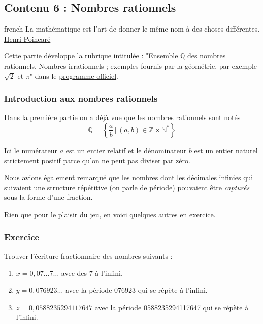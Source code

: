\documentclass[a4paper, 11pt, twoside]{article}
\newcommand{\E}[1]{\mathbb{#1}}
\begin{document}
\subsection{Contenu 6 : Nombres rationnels}
\label{sec:orgdee9ad7}

\begin{foreigndisplayquote}{french}
La mathématique est l'art de donner le même nom à des choses différentes.\\

\href{https://fr.wikipedia.org/wiki/Henri\_Poincar\%C3\%A9}{Henri Poincaré}
\end{foreigndisplayquote}


\startcontents[level-2]

Cette partie développe la rubrique intitulée : "Ensemble \(\E{Q}\) des
nombres rationnels. Nombres irrationnels ; exemples fournis par la
géométrie, par exemple \(\sqrt{2}\) et \(\pi\)" dans le \href{https://eduscol.education.fr/document/24553/download}{programme officiel}.

\subsubsection{Introduction aux nombres rationnels}
\label{sec:org38d990f}

Dans la première partie on a déjà vue que les nombres rationnels
sont notés \[\E{Q} = \left\{\dfrac{a}{b}\,|\,(a,
   b)\in\E{Z}\times\E{N}^*\right\}\]

Ici le numérateur \(a\) est un entier relatif et le dénominateur \(b\)
est un entier naturel strictement positif parce qu'on ne peut pas
diviser par zéro.

Nous avions également remarqué que les nombres dont les décimales
infinies qui suivaient une structure répétitive (on parle de
période) pouvaient être \emph{capturés} sous la forme d'une fraction.

Rien que pour le plaisir du jeu, en voici quelques autres en
exercice.

\subsubsection{Exercice}
\label{sec:orgca24f0a}
Trouver l'écriture fractionnaire des nombres suivants :
\begin{enumerate}
\item \(x = 0,07\dots7\dots\) avec des \(7\) à l'infini.
\item \(y = 0,076923\dots\) avec la période 076923 qui se répète à
l'infini.
\item \(z = 0,0588235294117647\) avec la période 0588235294117647 qui
se répète à l'infini.
\end{enumerate}
\end{document}
